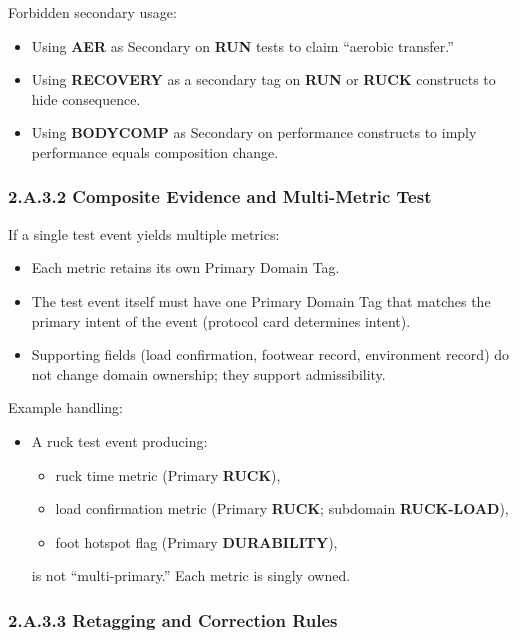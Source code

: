 \documentclass[10pt]{article}
\begin{document}
Forbidden secondary usage:

\begin{itemize}
\item Using \textbf{AER} as Secondary on \textbf{RUN} tests to claim “aerobic transfer.”
\item Using \textbf{RECOVERY} as a secondary tag on \textbf{RUN} or \textbf{RUCK} constructs to hide consequence.
\item Using \textbf{BODYCOMP} as Secondary on performance constructs to imply performance equals composition change.
\end{itemize}

\subsubsection*{2.A.3.2 Composite Evidence and Multi-Metric Test}

If a single test event yields multiple metrics:

\begin{itemize}
\item Each metric retains its own Primary Domain Tag.
\item The test event itself must have one Primary Domain Tag that matches the primary intent of the event (protocol card determines intent).
\item Supporting fields (load confirmation, footwear record, environment record) do not change domain ownership; they support admissibility.
\end{itemize}

Example handling:

\begin{itemize}
\item A ruck test event producing:
  \begin{itemize}
  \item ruck time metric (Primary \textbf{RUCK}),
  \item load confirmation metric (Primary \textbf{RUCK}; subdomain \textbf{RUCK-LOAD}),
  \item foot hotspot flag (Primary \textbf{DURABILITY}),
  \end{itemize}
  is not “multi-primary.” Each metric is singly owned.
\end{itemize}

\subsubsection*{2.A.3.3 Retagging and Correction Rules}
\end{document}

